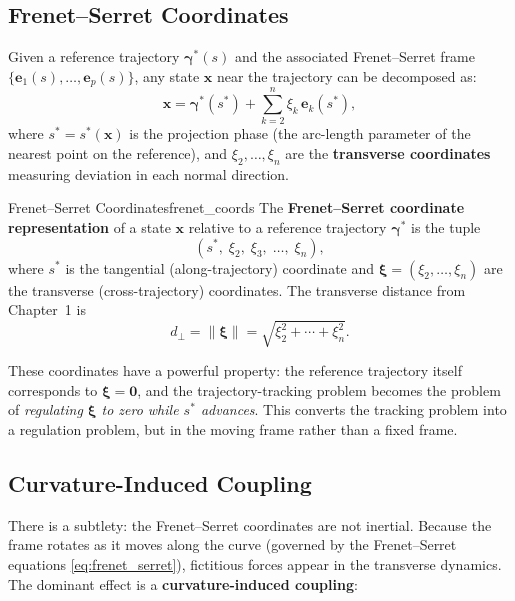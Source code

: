 \documentclass[12pt, openany]{book}
\theoremstyle{plain}
\newcommand{\state}{\bm{x}}
\newcommand{\traj}{\bm{\gamma}}
\newcommand{\norm}[1]{\left\lVert #1 \right\rVert}
\newcommand{\frenet}{\bm{e}}
\begin{document}
\subsection{Frenet--Serret Coordinates}

Given a reference trajectory $\traj^*(s)$ and the associated Frenet--Serret
frame $\{\frenet_1(s), \ldots, \frenet_p(s)\}$, any state $\state$ near the
trajectory can be decomposed as:
\begin{equation}\label{eq:frenet_coords}
  \state = \traj^*(s^*) + \sum_{k=2}^{n} \xi_k\, \frenet_k(s^*),
\end{equation}
where $s^* = s^*(\state)$ is the projection phase (the arc-length parameter of
the nearest point on the reference), and $\xi_2, \ldots, \xi_n$ are the
\textbf{transverse coordinates} measuring deviation in each normal direction.

\begin{definition}{Frenet--Serret Coordinates}{frenet_coords}
  The \textbf{Frenet--Serret coordinate representation} of a state $\state$ relative
  to a reference trajectory $\traj^*$ is the tuple
  \begin{equation}
    (s^*,\; \xi_2,\; \xi_3,\; \ldots,\; \xi_n),
  \end{equation}
  where $s^*$ is the tangential (along-trajectory) coordinate and
  $\bm{\xi} = (\xi_2, \ldots, \xi_n)$ are the transverse (cross-trajectory)
  coordinates. The transverse distance from Chapter~1 is
  \begin{equation}
    d_\perp = \norm{\bm{\xi}} = \sqrt{\xi_2^2 + \cdots + \xi_n^2}.
  \end{equation}
\end{definition}

These coordinates have a powerful property: the reference trajectory itself
corresponds to $\bm{\xi} = \bm{0}$, and the trajectory-tracking problem
becomes the problem of \emph{regulating $\bm{\xi}$ to zero while $s^*$
advances}. This converts the tracking problem into a regulation problem, but in
the moving frame rather than a fixed frame.

\subsection{Curvature-Induced Coupling}

There is a subtlety: the Frenet--Serret coordinates are not inertial. Because
the frame rotates as it moves along the curve (governed by the Frenet--Serret
equations \eqref{eq:frenet_serret}), fictitious forces appear in the transverse
dynamics. The dominant effect is a \textbf{curvature-induced coupling}:
\end{document}
